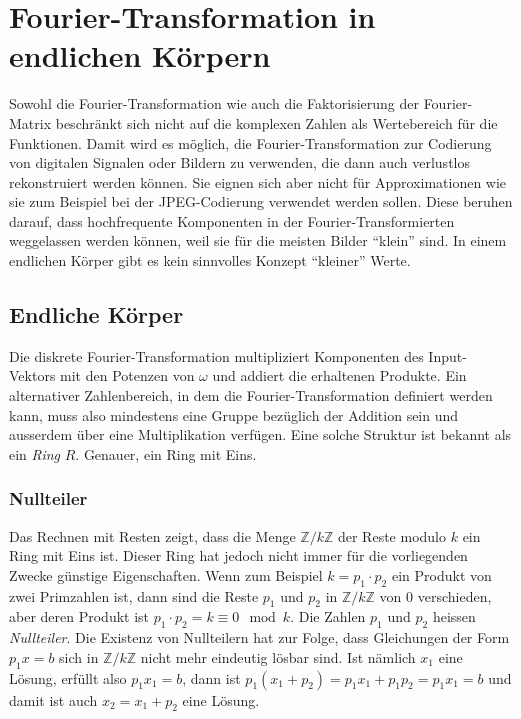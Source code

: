 %
%
%
\section{Fourier-Transformation in endlichen Körpern
\label{buch:diskret:section:koerper}}
Sowohl die Fourier-Transformation wie auch die Faktorisierung
der Fourier-Matrix beschränkt sich nicht auf die komplexen Zahlen
als Wertebereich für die Funktionen.
Damit wird es möglich, die Fourier-Transformation zur Codierung von
digitalen Signalen oder Bildern zu verwenden, die dann auch verlustlos
rekonstruiert werden können.
Sie eignen sich aber nicht für Approximationen wie sie zum Beispiel
bei der JPEG-Codierung verwendet werden sollen.
%
Diese beruhen darauf, dass hochfrequente Komponenten in der
Fourier-Transformierten weggelassen werden können, weil sie für die
meisten Bilder ``klein'' sind.
In einem endlichen Körper gibt es kein sinnvolles Konzept ``kleiner''
Werte.

%
%
\subsection{Endliche Körper
\label{buch:diskret:koerper:subsection:koerper}}
Die diskrete Fourier-Transformation multipliziert Komponenten des
Input-Vektors mit den Potenzen von $\omega$ und addiert die erhaltenen
Produkte.
Ein alternativer Zahlenbereich, in dem die Fourier-Transformation
definiert werden kann, muss also mindestens eine Gruppe bezüglich 
der Addition sein und ausserdem über eine Multiplikation verfügen.
Eine solche Struktur ist bekannt als ein {\em Ring} $R$.
Genauer, ein Ring mit Eins.

%
%
\subsubsection{Nullteiler}
Das Rechnen mit Resten zeigt, dass die Menge $\mathbb{Z}/k\mathbb{Z}$
der Reste modulo $k$ ein Ring mit Eins ist.
Dieser Ring hat jedoch nicht immer für die vorliegenden Zwecke günstige
Eigenschaften.
Wenn zum Beispiel $k=p_1\cdot p_2$ ein Produkt von zwei Primzahlen
ist, dann sind die Reste $p_1$ und $p_2$ in $\mathbb{Z}/k\mathbb{Z}$
von $0$ verschieden, aber deren Produkt ist
$p_1\cdot p_2 = k \equiv 0 \mod k$.
Die Zahlen $p_1$ und $p_2$ heissen {\em Nullteiler}.
%
Die Existenz von Nullteilern hat zur Folge, dass Gleichungen der
Form $p_1 x=b$ sich in $\mathbb{Z}/k\mathbb{Z}$ nicht mehr
eindeutig lösbar sind.
Ist nämlich $x_1$ eine Lösung, erfüllt also $p_1x_1=b$, dann ist
$p_1(x_1+p_2)=p_1x_1+p_1p_2=p_1x_1=b$ und damit ist auch $x_2=x_1+p_2$ 
eine Lösung.

